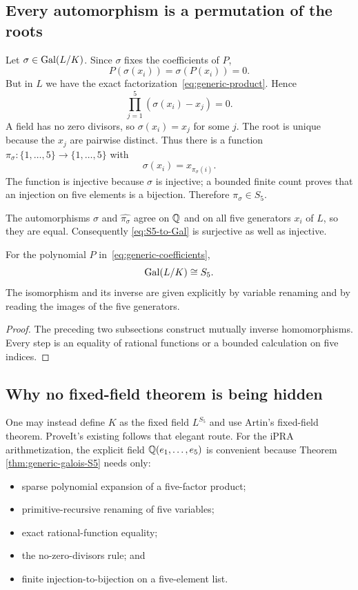 \subsection{Every automorphism is a permutation of the roots}

Let $\sigma\in\operatorname{Gal}(L/K)$.  Since $\sigma$ fixes the coefficients of $P$,
\[
 P(\sigma(x_i))=\sigma(P(x_i))=0.
 \tag{G4}\label{eq:auto-root}
\]
But in $L$ we have the exact factorization~\eqref{eq:generic-product}.  Hence
\[
 \prod_{j=1}^{5}(\sigma(x_i)-x_j)=0.
\]
A field has no zero divisors, so $\sigma(x_i)=x_j$ for some $j$.  The root is
unique because the $x_j$ are pairwise distinct.  Thus there is a function
$\pi_\sigma:\{1,\ldots,5\}\to\{1,\ldots,5\}$ with
\[
 \sigma(x_i)=x_{\pi_\sigma(i)}.
\]
The function is injective because $\sigma$ is injective; a bounded finite
count proves that an injection on five elements is a bijection.  Therefore
$\pi_\sigma\in S_5$.

The automorphisms $\sigma$ and $\widehat{\pi_\sigma}$ agree on $\mathbb Q$ and on all
five generators $x_i$ of $L$, so they are equal.  Consequently
\eqref{eq:S5-to-Gal} is surjective as well as injective.

\begin{theorem}
\label{thm:generic-galois-S5}
For the polynomial $P$ in~\eqref{eq:generic-coefficients},
\[
 \operatorname{Gal}(L/K)\cong S_5.
\]
The isomorphism and its inverse are given explicitly by variable renaming and
by reading the images of the five generators.
\end{theorem}

\begin{proof}
The preceding two subsections construct mutually inverse homomorphisms.  Every
step is an equality of rational functions or a bounded calculation on five
indices.
\end{proof}

\subsection{Why no fixed-field theorem is being hidden}

One may instead define $K$ as the fixed field $L^{S_5}$ and use Artin's
fixed-field theorem.  ProveIt's existing  follows
that elegant route.  For the iPRA arithmetization, the explicit field
$\mathbb Q(e_1,\ldots,e_5)$ is convenient because Theorem
\ref{thm:generic-galois-S5} needs only:

\begin{itemize}
\item sparse polynomial expansion of a five-factor product;
\item primitive-recursive renaming of five variables;
\item exact rational-function equality;
\item the no-zero-divisors rule; and
\item finite injection-to-bijection on a five-element list.
\end{itemize}

